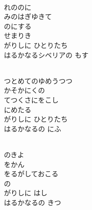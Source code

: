 \documentclass[10pt,b5j]{tarticle} %
\begin{document}
\begin{enumerate}
\begin{minipage}[c]{\blocksize}
        \vspace{\linespace}
        \item~\\
        れののに\\
        みのはぎゆきて\\
        のにする\\
        せまりき\\
        がりしに ひとりたち\\
        はるかなるシベリアの もす
        
    \end{minipage}
    \begin{minipage}[c]{\blocksize}
        
        \vspace{\linespace}
        \item~\\
        つとめてのゆめうつつ\\
        かそかにくの\\
        てつくさにをこし\\
        にめたる\\
        がりしに ひとりたち\\
        はるかなるの にふ
        
    \end{minipage}
    \begin{minipage}[c]{\blocksize}
        
        \vspace{\linespace}
        \item~\\
        のきよ\\
        をかん\\
        をるがしておこる\\
        の\\
        がりしに はし\\
        はるかなるの きつ

    
    \end{minipage}
\end{enumerate} %
\end{document}

